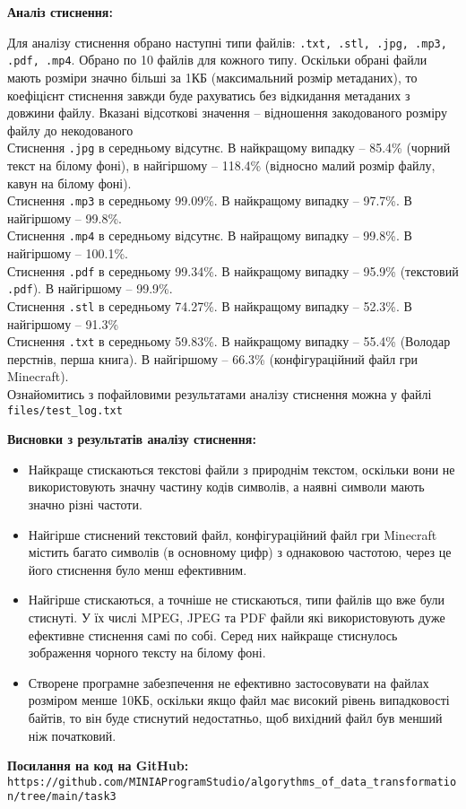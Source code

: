 \documentclass{article}
\def\code#1{\texttt{#1}}
\begin{document}
\textbf{Аналіз стиснення:}\\\indent

Для аналізу стиснення обрано наступні типи файлів: \code{.txt, .stl, .jpg, .mp3, .pdf, .mp4}. Обрано по 10 файлів для кожного типу. Оскільки обрані файли мають розміри значно більші за 1КБ (максимальний розмір метаданих), то коефіцієнт стиснення завжди буде рахуватись без відкидання метаданих з довжини файлу. Вказані відсоткові значення -- відношення закодованого розміру файлу до некодованого\\\indent
Стиснення \code{.jpg} в середньому відсутнє. В найкращому випадку -- 85.4\% (чорний текст на білому фоні), в найгіршому -- 118.4\% (відносно малий розмір файлу, кавун на білому фоні).\\\indent
Стиснення \code{.mp3} в середньому  99.09\%. В найкращому випадку -- 97.7\%. В найгіршому -- 99.8\%.\\\indent
Стиснення \code{.mp4} в середньому відсутнє. В найращому випадку -- 99.8\%. В найгіршому -- 100.1\%.\\\indent
Стиснення \code{.pdf} в середньому 99.34\%. В найкращому випадку -- 95.9\% (текстовий \code{.pdf}). В найгіршому -- 99.9\%.\\\indent
Стиснення \code{.stl} в середньому 74.27\%. В найкращому випадку -- 52.3\%. В найгіршому -- 91.3\%\\\indent
Стиснення \code{.txt} в середньому 59.83\%. В найкращому випадку -- 55.4\% (Володар перстнів, перша книга). В найгіршому -- 66.3\% (конфігураційний файл гри Minecraft).\\\indent
Ознайомитись з пофайловими результатами аналізу стиснення можна у файлі \code{files/test\_log.txt}\\\indent

\textbf{Висновки з результатів аналізу стиснення:}\\\indent
\begin{itemize}
    \item Найкраще стискаються текстові файли з природнім текстом, оскільки вони не використовують значну частину кодів символів, а наявні символи мають значно різні частоти.
    \item Найгірше стиснений текстовий файл, конфігураційний файл гри Minecraft містить багато символів (в основному цифр) з однаковою частотою, через це його стиснення було менш ефективним.
    \item Найгірше стискаються, а точніше не стискаються, типи файлів що вже були стиснуті. У їх числі MPEG, JPEG та PDF файли які використовують дуже ефективне стиснення самі по собі. Серед них найкраще стиснулось зображення чорного тексту на білому фоні.
    \item Створене програмне забезпечення не ефективно застосовувати на файлах розміром менше 10КБ, оскільки якщо файл має високий рівень випадковості байтів, то він буде стиснутий недостатньо, щоб вихідний файл був менший ніж початковий.\\\indent
\end{itemize}


\textbf{Посилання на код на GitHub:}\\
\code{https://github.com/MINIAProgramStudio/algorythms\_of\_data\_transformation/tree/main/task3}
\end{document}
